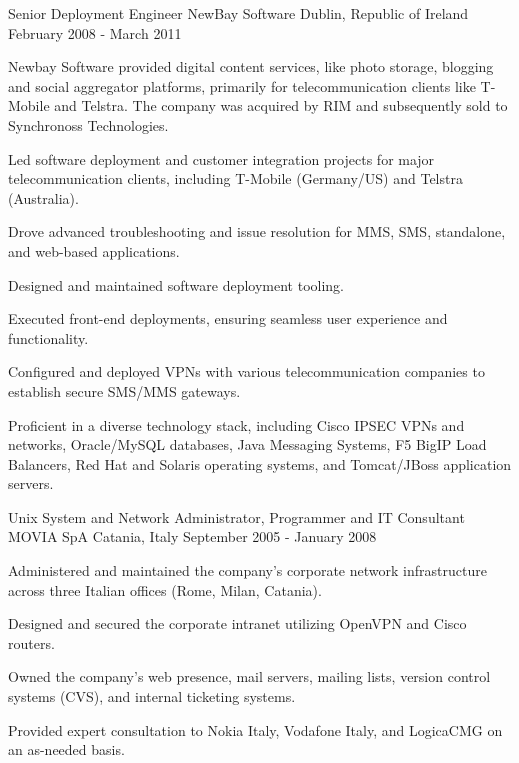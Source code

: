 \begin{cventries}
  \cventry
  {Senior Deployment Engineer} %
  {NewBay Software} %
  {Dublin, Republic of Ireland} %
  {February 2008 - March 2011} %
  {
    Newbay Software provided digital content services, like photo storage, blogging and social aggregator platforms,
    primarily for telecommunication clients like T-Mobile and Telstra.
    The company was acquired by RIM and subsequently sold to Synchronoss Technologies.
    \vspace{2mm}
    \begin{cvitems} %
      \item Led software deployment and customer integration projects for major telecommunication clients, including T-Mobile (Germany/US) and Telstra (Australia).
      \item Drove advanced troubleshooting and issue resolution for MMS, SMS, standalone, and web-based applications.
      \item Designed and maintained software deployment tooling.
      \item Executed front-end deployments, ensuring seamless user experience and functionality.
      \item Configured and deployed VPNs with various telecommunication companies to establish secure SMS/MMS gateways.
      \item Proficient in a diverse technology stack, including Cisco IPSEC VPNs and networks, Oracle/MySQL databases, Java Messaging Systems, F5 BigIP Load Balancers, Red Hat and Solaris operating systems, and Tomcat/JBoss application servers.
    \end{cvitems}
  }

  \cventry
  {Unix System and Network Administrator, Programmer and IT Consultant} %
  {MOVIA SpA} %
  {Catania, Italy} %
  {September 2005 - January 2008} %
  {
    \begin{cvitems} %
      \item Administered and maintained the company's corporate network infrastructure across three Italian offices (Rome, Milan, Catania).
      \item Designed and secured the corporate intranet utilizing OpenVPN and Cisco routers.
      \item Owned the company's web presence, mail servers, mailing lists, version control systems (CVS), and internal ticketing systems.
      \item Provided expert consultation to Nokia Italy, Vodafone Italy, and LogicaCMG on an as-needed basis.
    \end{cvitems}
  }


\end{cventries}
